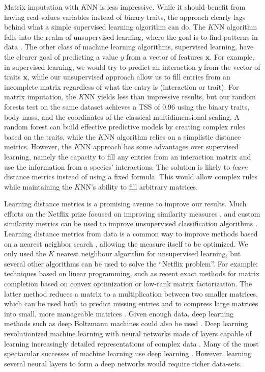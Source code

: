 \documentclass[letterpaper]{article}
\begin{document}
Matrix imputation with $K$NN is less impressive. While it should benefit from
having real-values variables instead of binary traits, the approach clearly
lags behind what a simple supervised learning algorithm can do. The $K$NN
algorithm falls into the realm of unsupervised learning, where the goal is to
find patterns in data \cite{mur12}. The other class of machine learning
algorithms, supervised learning, have the clearer goal of predicting a value
$y$ from a vector of features $\mathbf{x}$. For example, in supervised
learning, we would try to predict an interaction $y$ from the vector of traits
$\mathbf{x}$, while our unsupervised approach allow us to fill entries from an
incomplete matrix regardless of what the entry is (interaction or trait). For
matrix imputation, the $K$NN yields less than impressive results, but our
random forests test on the same dataset achieves a TSS of 0.96 using the binary
traits, body mass, and the coordinates of the classical multidimensional
scaling. A random forest can build effective predictive models by creating
complex rules based on the traits, while the $K$NN algorithm relies on a
simplistic distance metrics. However, the $K$NN approach has some advantages
over supervised learning, namely the capacity to fill any entries from an
interaction matrix and use the information from a species' interactions. The
solution is likely to \emph{learn} distance metrics \cite{bel15} instead of
using a fixed formula. This would allow complex rules while maintaining the
$K$NN's ability to fill arbitrary matrices.

Learning distance metrics is a promising avenue to improve our results. Much
efforts on the Netflix prize focused on improving similarity measures
\cite{tos08,hon06}, and custom similarity metrics can be used to improve
unsupervised classification algorithms \cite{bel15}. Learning distance metrics
from data is a common way to improve methods based on a nearest neighbor search
\cite{xin03,bel15}, allowing the measure itself to be optimized. We only used
the $K$ nearest neighbour algorithm for unsupervised learning, but several
other algorithms can be used to solve the ``Netflix problem''.  For example:
techniques based on linear programming, such as recent exact methods for matrix
completion based on convex optimization \cite{can09} or low-rank matrix
factorization. The latter method reduces a matrix to a multiplication between
two smaller matrices, which can be used both to predict missing entries and to
compress large matrices into small, more manageable matrices \cite{van13}.
Given enough data, deep learning methods such as deep Boltzmann machines could
also be used \cite{zha11}. Deep learning revolutionized machine learning with
neural networks made of layers capable of learning increasingly detailed
representations of complex data \cite{hin06}. Many of the most spectacular
successes of machine learning use deep learning \cite{mni13}. However, learning
several neural layers to form a deep networks would require richer data-sets.
\end{document}
